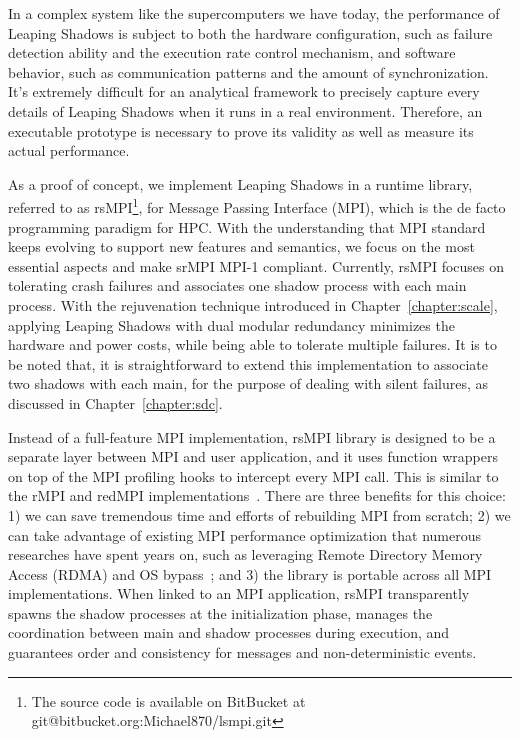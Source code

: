 In a complex system like the supercomputers we have today, the performance of Leaping Shadows is subject to both the hardware configuration, such as failure detection ability and the execution rate control mechanism, and software behavior, such as communication patterns and the amount of synchronization. 
It's extremely difficult for an analytical framework to precisely capture every details of Leaping Shadows when it runs in a real environment. Therefore, an executable prototype is necessary to prove its validity as well as measure its actual performance. 

As a proof of concept, we implement Leaping Shadows in a runtime library, referred to as rsMPI\footnote{The source code is available on BitBucket at git@bitbucket.org:Michael870/lsmpi.git}, for Message Passing Interface (MPI), which is the de facto programming paradigm for HPC. With the understanding that MPI standard keeps evolving to support new features and semantics, we focus on the most essential aspects and make srMPI MPI-1 compliant. %
Currently, rsMPI focuses on tolerating crash failures and associates one shadow process with each main process. %
With the rejuvenation technique introduced in Chapter~\ref{chapter:scale}, applying Leaping Shadows with dual modular redundancy minimizes the hardware and power costs, while being able to tolerate multiple failures. It is to be noted that, it is straightforward to extend this implementation to associate two shadows with each main, for the purpose of dealing with silent failures, as discussed in Chapter~\ref{chapter:sdc}. 


Instead of a full-feature MPI implementation, rsMPI library is designed to be a separate layer between MPI and user application, and it uses function wrappers on top of the MPI profiling hooks to intercept every MPI call. This is similar to the rMPI and redMPI implementations~\cite{ferreira_sc_2011,fiala_2012_sdc}. There are three benefits for this choice: 1) we can save tremendous time and efforts of rebuilding MPI from scratch; 2) we can take advantage of existing MPI performance optimization that numerous researches have spent years on, such as leveraging Remote Directory
Memory Access (RDMA) and OS bypass~\cite{woodall2006high}; and 3) the library is portable across all MPI implementations. 
When linked to an MPI application, rsMPI transparently spawns the shadow processes at the initialization phase, manages the coordination between main and shadow processes during execution, and guarantees order and consistency for messages and non-deterministic events.

